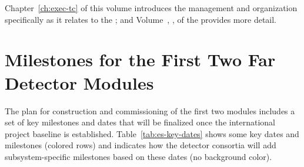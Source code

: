 Chapter~\ref{ch:exec-tc} of this volume %
introduces the  management and organization specifically as it relates to the ; and Volume~\volnumbertc{}, \voltitletc{}, of the  provides more detail.

\section{Milestones for the First Two Far Detector Modules} 

The plan for construction and commissioning of the first two  modules includes a set of key milestones and dates 
that will be finalized once the international project baseline is established.  Table~\ref{tab:es-key-dates} shows some key dates and milestones (colored rows) and indicates how the detector consortia will add subsystem-specific milestones based on these dates (no background color).
 
